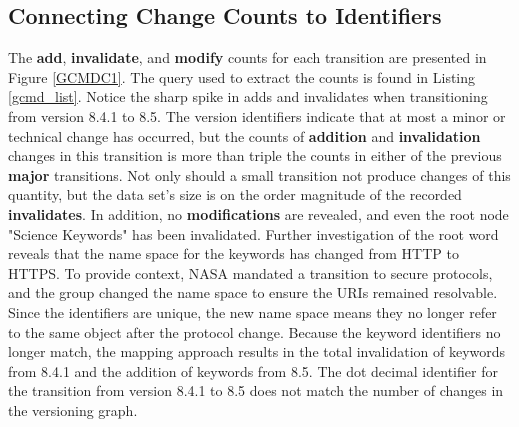 \subsection{Connecting Change Counts to Identifiers}

The \textbf{add}, \textbf{invalidate}, and \textbf{modify} counts for each transition are presented in Figure \ref{GCMDC1}.
The query used to extract the counts is found in Listing \ref{gcmd_list}.
Notice the sharp spike in adds and invalidates when transitioning from version 8.4.1 to 8.5.
The version identifiers indicate that at most a minor or technical change has occurred, but the counts of \textbf{addition} and \textbf{invalidation} changes in this transition is more than triple the counts in either of the previous \textbf{major} transitions.
Not only should a small transition not produce changes of this quantity, but the data set's size is on the order magnitude of the recorded \textbf{invalidates}.
In addition, no \textbf{modifications} are revealed, and even the root node "Science Keywords" has been invalidated.
Further investigation of the root word reveals that the name space for the keywords has changed from HTTP to HTTPS.
To provide context, NASA mandated a transition to secure protocols, and the group changed the name space to ensure the URIs remained resolvable.
Since the identifiers are unique, the new name space means they no longer refer to the same object after the protocol change.
Because the keyword identifiers no longer match, the mapping approach results in the total invalidation of keywords from 8.4.1 and the addition of keywords from 8.5.
The dot decimal identifier for the transition from version 8.4.1 to 8.5 does not match the number of changes in the versioning graph.

